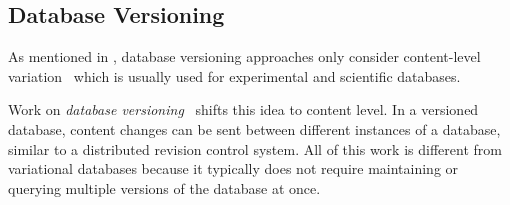 \subsection{Database Versioning}
\label{sec:db-ver}
As mentioned in , database versioning approaches only consider
content-level variation~\cite{dbVersioning} which is usually used for experimental and
scientific databases.

Work on \emph{database versioning}~\cite{datasetVersioning,dbVersioning}
shifts this idea to content level. In a versioned database, 
content changes can be sent between different instances of a database,
similar to a distributed revision control system.
%
All of this work is different from variational databases because it typically
does not require maintaining or querying multiple versions of the database at
once.
%

